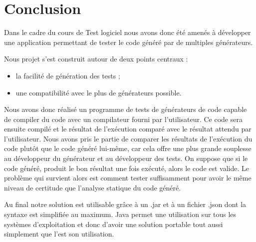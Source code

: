 \chapter*{Conclusion}

Dans le cadre du cours de Test logiciel nous avons donc été amenés à développer
une application permettant de tester le code généré par de multiples générateurs.

Nous projet s'est construit autour de deux points centraux :

\begin{itemize}
    \item la facilité de génération des tests ;
    \item une compatibilité avec le plus de générateurs possible.
\end{itemize}

Nous avons donc réalisé un programme de tests de générateurs de code capable de compiler du code avec un compilateur fourni par l'utilisateur.
Ce code sera ensuite compilé et le résultat de l’exécution comparé avec le résultat attendu par l'utilisateur. Nous avons pris le partie de
comparer les résultats de l’exécution du code plutôt que le code généré lui-même, car cela offre une plus grande souplesse au développeur
du générateur et au développeur des tests. On suppose que si le code généré, produit le bon résultat une fois exécuté, alors le code est valide.
Le problème qui survient alors est comment tester suffisamment pour avoir le même niveau de certitude que l'analyse statique du code généré.

Au final notre solution est utilisable grâce à un .jar et à un fichier .json dont
la syntaxe est simplifiée au maximum. Java permet une utilisation sur tous les
systèmes d'exploitation et donc d'avoir une solution portable tout aussi simplement
que l'est son utilisation.
